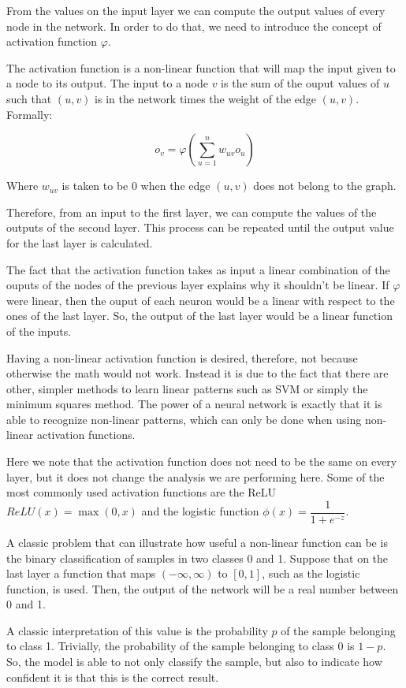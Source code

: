 From the values on the input layer we can compute the output values of every node in the network.
In order to do that, we need to introduce the concept of activation function $\varphi$.

The activation function is a non-linear function that will map the input given to a node to its output.
The input to a node $v$ is the sum of the ouput values of $u$ such that $(u, v)$ is in the network times the weight of the edge $(u,v)$.
Formally:

$$
o_v = \varphi\left(\sum_{u=1}^{n} w_{uv} o_u\right)
$$

Where $w_{uv}$ is taken to be 0 when the edge $(u, v)$ does not belong to the graph.

Therefore, from an input to the first layer, we can compute the values of the outputs of the second layer.
This process can be repeated until the output value for the last layer is calculated.

The fact that the activation function takes as input a linear combination of the ouputs of the nodes of the previous layer explains why it shouldn't be linear.
If $\varphi$ were linear, then the ouput of each neuron would be a linear with respect to the ones of the last layer.
So, the output of the last layer would be a linear function of the inputs.

Having a non-linear activation function is desired, therefore, not because otherwise the math would not work.
Instead it is due to the fact that there are other, simpler methods to learn linear patterns such as SVM or simply the minimum squares method.
The power of a neural network is exactly that it is able to recognize non-linear patterns, which can only be done when using non-linear activation functions.

Here we note that the activation function does not need to be the same on every layer, but it does not change the analysis we are performing here.
Some of the most commonly used activation functions are the ReLU $ReLU(x) = \max(0, x)$ and the logistic function $\phi(x) = \dfrac{1}{1+e^{-z}}$.

A classic problem that can illustrate how useful a non-linear function can be is the binary classification of samples in two classes 0 and 1.
Suppose that on the last layer a function that maps $(-\infty, \infty)$ to $[0,1]$, such as the logistic function, is used.
Then, the output of the network will be a real number between 0 and 1.

A classic interpretation of this value is the probability $p$ of the sample belonging to class 1.
Trivially, the probability of the sample belonging to class 0 is $1-p$.
So, the model is able to not only classify the sample, but also to indicate how confident it is that this is the correct result.

